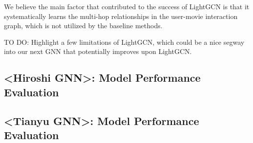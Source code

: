 \documentclass{article}
\begin{document}
We believe the main factor that contributed to the success of LightGCN is that it systematically learns the multi-hop relationships in the user-movie interaction graph, which is not utilized by the baseline methods.

 TO DO: Highlight a few limitations of LightGCN, which could be a nice segway into our next GNN that potentially improves upon LightGCN.





\subsection{<Hiroshi GNN>: Model Performance Evaluation}

\subsection{<Tianyu GNN>: Model Performance Evaluation}




\end{document}
